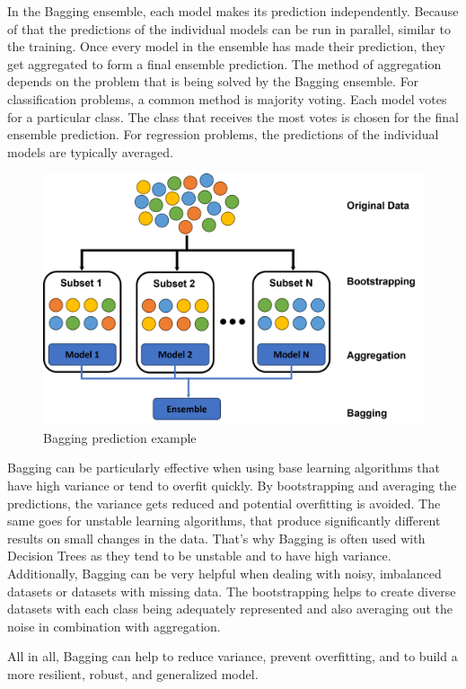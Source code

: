 In the Bagging ensemble, each model makes its prediction independently. Because of
that the predictions of the individual models can be run in parallel, similar to
the training. Once every model in the ensemble has made their prediction, they get
aggregated to form a final ensemble prediction. The method of aggregation depends
on the problem that is being solved by the Bagging ensemble. 
For classification problems, a common method is majority voting. Each model votes 
for a particular class. The class that receives the most votes is chosen for the
final ensemble prediction.
For regression problems, the predictions of the individual models are typically 
averaged.

\begin{figure}[htbp]
    \centering
    \includegraphics[width=.5\textwidth]{figures/bagging_prediction}
    \caption{Bagging prediction example}
\end{figure}

\newpage
Bagging can be particularly effective when using base learning algorithms
that have high variance or tend to overfit quickly. By bootstrapping and 
averaging the predictions, the variance gets reduced and potential overfitting
is avoided.
The same goes for unstable learning algorithms, that produce significantly different
results on small changes in the data. That's why Bagging is often used with Decision
Trees as they tend to be unstable and to have high variance.
Additionally, Bagging can be very helpful when dealing with noisy, imbalanced 
datasets or datasets with missing data. The bootstrapping helps to create 
diverse datasets with each class being adequately represented and also averaging
out the noise in combination with aggregation.


All in all, Bagging can help to reduce variance, prevent overfitting, and to build
a more resilient, robust, and generalized model.

